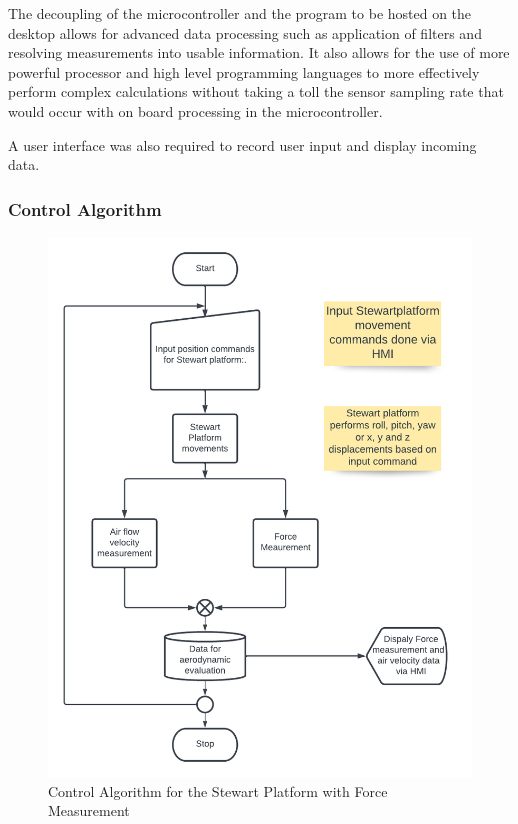 The decoupling of the microcontroller and the program to be hosted on the desktop allows for advanced data processing such as application of filters and resolving measurements into usable information. It also allows for the use of more powerful processor and high level programming languages to more effectively perform complex calculations without taking a toll the sensor sampling rate that would occur with on board processing in the microcontroller.

A user interface was also required to record user input and display incoming data.
\subsubsection{Control Algorithm}
\begin{center}
	\begin{figure}[H]
	\centering
	\includegraphics[width=0.7\linewidth]{Figures/Flow}
	\caption[Control Algorithm]{Control Algorithm for the Stewart Platform with Force Measurement}
	\end{figure}
\end{center}

